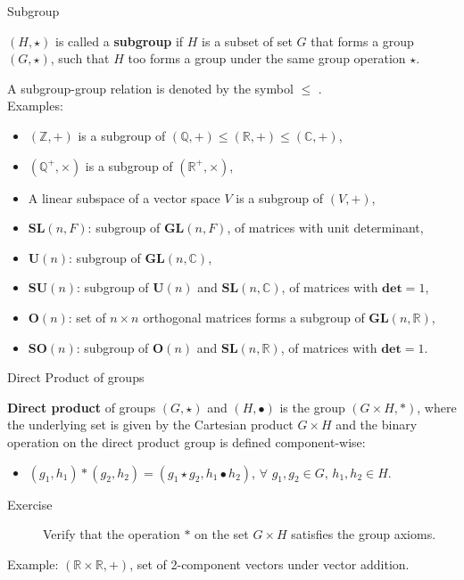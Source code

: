 \documentclass{beamer}
\newcommand\boldtext[1]{\textcolor{bolds}{\textbf{#1}}}
\begin{document}
\begin{frame}{Subgroup}
    \begin{definition}
        $(H,\star)$ is called a \boldtext{subgroup} if $H$ is a subset of set $G$ that forms a group $(G,\star )$, such that $H$ too forms a group under the same group operation $\star$.
    \end{definition}
    A subgroup-group relation is denoted by the symbol $\leq$ .\\
    Examples:
    \begin{itemize}
        \item $(\mathbb{Z},+)$ is a subgroup of $(\mathbb{Q},+)\leq(\mathbb{R},+)\leq(\mathbb{C},+)$,
        \item $(\mathbb{Q}^+,\times)$ is a subgroup of $(\mathbb{R}^+,\times)$,
        \item A linear subspace of a vector space $V$ is a subgroup of $(V,+)$,
        \item $\mathbf{SL}(n,F)$: subgroup of $\mathbf{GL}(n,F)$, of matrices with unit determinant,
        \item $\mathbf{U}(n)$: subgroup of $\mathbf{GL}(n,\mathbb{C})$,
        \item $\mathbf{SU}(n)$: subgroup of $\mathbf{U}(n)$ and $\mathbf{SL}(n,\mathbb{C})$, of matrices with $\mathbf{det}=1$,
        \item $\mathbf{O}(n)$: set of $n\times n$ orthogonal matrices forms a subgroup of $\mathbf{GL}(n,\mathbb{R})$,
        \item $\mathbf{SO}(n)$: subgroup of $\mathbf{O}(n)$ and $\mathbf{SL}(n,\mathbb{R})$, of matrices with $\mathbf{det}=1$.
    \end{itemize}
\end{frame}

\begin{frame}{Direct Product of groups}
    \begin{definition}
        \boldtext{Direct product} of groups $(G,\star)$ and $(H,\bullet)$ is the group $(G\times H,\ast)$, where the underlying set is given by the Cartesian product $G\times H$ and the binary operation on the direct product group is defined component-wise:
        \begin{itemize}
            \item $(g_1,h_1)\ast(g_2,h_2)=(g_1\star g_2,h_1\bullet h_2)$, $\forall$ $g_1,g_2\in G$, $h_1,h_2\in H$.
        \end{itemize}
    \end{definition}
    \begin{description}
        \item[Exercise] Verify that the operation $\ast$ on the set $G\times H$ satisfies the group axioms. 
    \end{description}
    Example: $(\mathbb{R}\times\mathbb{R},+)$, set of 2-component vectors under vector addition.
\end{frame}
\end{document}
